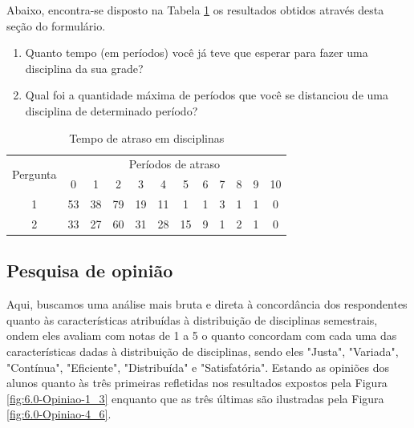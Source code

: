 Abaixo, encontra-se disposto na Tabela \ref{table:5.0-Atrasos} os resultados obtidos através desta seção do formulário.

\begin{enumerate}
  \item Quanto tempo (em períodos) você já teve que esperar para fazer uma disciplina da sua grade?
  \item Qual foi a quantidade máxima de períodos que você se distanciou de uma disciplina de determinado período?
\end{enumerate}


\begin{table}[htbp]
  \centering
  \caption{\label{table:5.0-Atrasos}Tempo de atraso em disciplinas}
  \begin{tabular}{| c | c c c c c c c c c c c |}
    \hline
    \multicolumn{1}{|c|}{\multirow{2}{*}{Pergunta}} &
    \multicolumn{11}{c|}{Períodos de atraso}                                                          \\
    \multicolumn{1}{|c|}{}                          &
    \multicolumn{1}{c|}{0}                          &
    \multicolumn{1}{c|}{1}                          &
    \multicolumn{1}{c|}{2}                          &
    \multicolumn{1}{c|}{3}                          &
    \multicolumn{1}{c|}{4}                          &
    \multicolumn{1}{c|}{5}                          &
    \multicolumn{1}{c|}{6}                          &
    \multicolumn{1}{c|}{7}                          &
    \multicolumn{1}{c|}{8}                          &
    \multicolumn{1}{c|}{9}                          &
    \multicolumn{1}{|c|}{10}
    \\
    \hline
    1                                               & 53 & 38 & 79 & 19 & 11 & 1  & 1 & 3 & 1 & 1 & 0 \\
    2                                               & 33 & 27 & 60 & 31 & 28 & 15 & 9 & 1 & 2 & 1 & 0 \\
    \hline
  \end{tabular}
\end{table}

\subsection{Pesquisa de opinião} %

Aqui, buscamos uma análise mais bruta e direta à concordância dos respondentes quanto às características atribuídas à distribuição de disciplinas semestrais, ondem eles avaliam com notas de 1 a 5 o quanto concordam com cada uma das características dadas à distribuição de disciplinas, sendo eles "Justa", "Variada", "Contínua", "Eficiente", "Distribuída" e "Satisfatória". Estando as opiniões dos alunos quanto às três primeiras refletidas nos resultados expostos pela Figura \ref{fig:6.0-Opiniao-1_3} enquanto que as três últimas são ilustradas pela Figura \ref{fig:6.0-Opiniao-4_6}.

